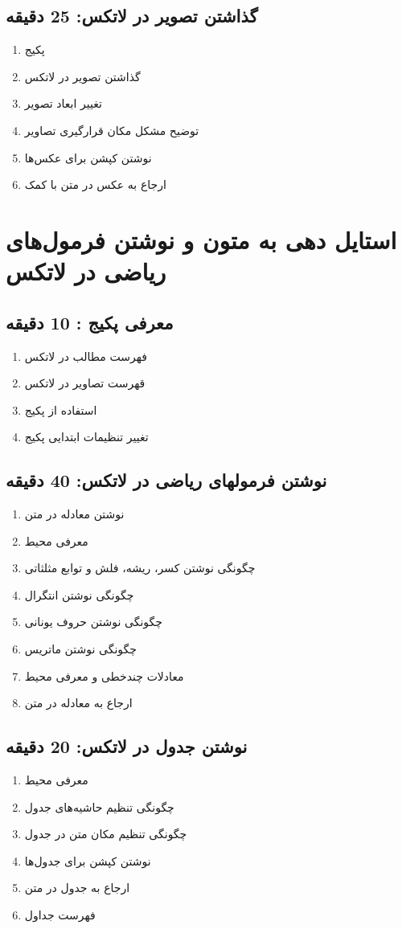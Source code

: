 \documentclass{article}
\begin{document}
\subsection*{گذاشتن تصویر در لاتکس: 25 دقیقه}
\begin{enumerate}
\item پکیج 
\item گذاشتن تصویر در لاتکس
\item تغییر ابعاد تصویر
\item توضیح مشکل مکان قرارگیری تصاویر 
\item نوشتن کپشن برای عکس‌ها
\item ارجاع به عکس در متن با کمک 
\end{enumerate}



\section{استایل دهی به متون و نوشتن فرمول‌های ریاضی در لاتکس}
\subsection*{معرفی پکیج : 10 دقیقه}
\begin{enumerate}
\item فهرست مطالب در لاتکس
\item قهرست تصاویر در لاتکس
\item استفاده از پکیج 
\item تغییر تنظیمات ابتدایی پکیج  
\end{enumerate}
\subsection*{نوشتن فرمولهای ریاضی در لاتکس: 40 دقیقه}
\begin{enumerate}
\item نوشتن معادله در متن
\item معرفی محیط 
\item چگونگی نوشتن کسر، ریشه، فلش و توابع مثلثاتی
\item چگونگی نوشتن انتگرال
\item چگونگی نوشتن حروف یونانی
\item چگونگی نوشتن ماتریس
\item معادلات چندخطی و معرفی محیط 
\item ارجاع به معادله در متن
\end{enumerate}
\subsection*{نوشتن جدول در لاتکس: 20 دقیقه}
\begin{enumerate}
\item معرفی محیط 
\item چگونگی تنظیم حاشیه‌های جدول
\item چگونگی تنظیم مکان متن در جدول
\item نوشتن کپشن برای جدول‌ها 
\item ارجاع به جدول در متن
\item فهرست جداول
\end{enumerate}
\end{document}

